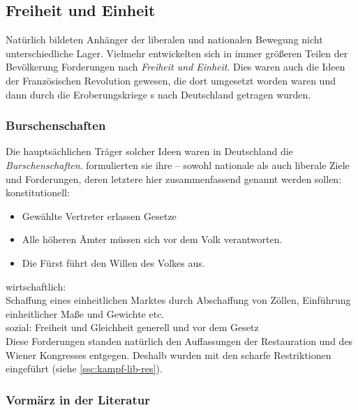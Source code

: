 \subsection{Freiheit und Einheit}

Natürlich bildeten Anhänger der liberalen und nationalen Bewegung
nicht unterschiedliche Lager. Vielmehr entwickelten sich in immer
größeren Teilen der Bevölkerung Forderungen nach \emph{Freiheit und
Einheit}. Dies waren auch die Ideen der Französischen Revolution
gewesen, die dort umgesetzt worden waren und dann durch die
Eroberungskriege s nach Deutschland
getragen wurden.

\subsubsection{Burschenschaften}

Die hauptsächlichen Träger solcher Ideen waren in Deutschland die
\emph{Burschenschaften}.  formulierten
sie ihre  -- sowohl
nationale als auch liberale Ziele und Forderungen, deren letztere hier
zusammenfassend genannt werden sollen: \\

\noindent konstitutionell:
\begin{itemize}
\item Gewählte Vertreter erlassen Gesetze
\item Alle höheren Ämter müssen sich vor dem Volk verantworten.
\item Die Fürst führt den Willen des Volkes aus. 
\end{itemize} 

\noindent wirtschaftlich:\\
Schaffung eines einheitlichen Marktes durch Abschaffung von Zöllen,
Einführung einheitlicher Maße und Gewichte etc.\\

\noindent sozial:
Freiheit und Gleichheit generell und vor dem Gesetz \\

Diese Forderungen standen natürlich den Auffassungen der Restauration
und des Wiener Kongresses entgegen. Deshalb wurden mit den
 scharfe Restriktionen
eingeführt (siehe \ref{ssc:kampf-lib-res}).


\subsubsection{Vormärz in der Literatur}

